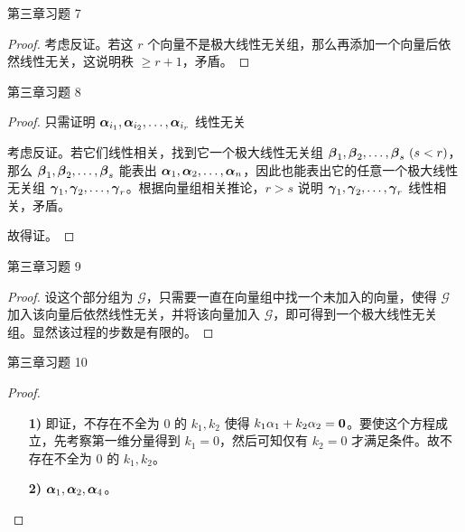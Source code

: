 \begin{problem}
	第三章习题 7

	\begin{proof}
		考虑反证。若这 $r$ 个向量不是极大线性无关组，那么再添加一个向量后依然线性无关，这说明秩 $\ge r + 1$，矛盾。
	\end{proof}
\end{problem}

\begin{problem}
	第三章习题 8

	\begin{proof}
		只需证明 $\boldsymbol{\alpha}_{i_1}, \boldsymbol{\alpha}_{i_2}, \dots, \boldsymbol{\alpha}_{i_r}$ 线性无关
		
		考虑反证。若它们线性相关，找到它一个极大线性无关组 $\boldsymbol{\beta}_1, \boldsymbol{\beta}_2, \dots, \boldsymbol{\beta}_s\ (s<r)$，那么 $\boldsymbol{\beta}_1, \boldsymbol{\beta}_2, \dots, \boldsymbol{\beta}_s$ 能表出 $\boldsymbol{\alpha}_1, \boldsymbol{\alpha}_2, \dots, \boldsymbol{\alpha}_n$，因此也能表出它的任意一个极大线性无关组 $\boldsymbol{\gamma}_1, \boldsymbol{\gamma}_2, \dots, \boldsymbol{\gamma}_r$。根据向量组相关推论，$r > s$ 说明 $\boldsymbol{\gamma}_1, \boldsymbol{\gamma}_2, \dots, \boldsymbol{\gamma}_r$ 线性相关，矛盾。
		
		故得证。
	\end{proof}
\end{problem}

\begin{problem}
	第三章习题 9

	\begin{proof}
		设这个部分组为 $\mathcal{G}$，只需要一直在向量组中找一个未加入的向量，使得 $\mathcal{G}$ 加入该向量后依然线性无关，并将该向量加入 $\mathcal{G}$，即可得到一个极大线性无关组。显然该过程的步数是有限的。
	\end{proof}
\end{problem}

\begin{problem}
	第三章习题 10
	
	\begin{proof}
		\begin{enumerate}
			\item[\textbf{1)}] 即证，不存在不全为 $0$ 的 $k_1,k_2$ 使得 $k_1 \alpha_1 + k_2 \alpha_2 = \boldsymbol{0}$。要使这个方程成立，先考察第一维分量得到 $k_1 = 0$，然后可知仅有 $k_2 = 0$ 才满足条件。故不存在不全为 $0$ 的 $k_1,k_2$。
			
			\item[\textbf{2)}] $\boldsymbol{\alpha}_1, \boldsymbol{\alpha}_2, \boldsymbol{\alpha}_4$。
		\end{enumerate}
	\end{proof}
\end{problem}

